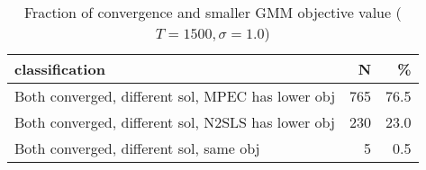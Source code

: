 \begin{table}

\caption{\label{tab:unnamed-chunk-23}Fraction of convergence and smaller GMM objective value ($T=1500,\sigma=1.0$)}
\centering
\begin{tabular}[t]{lrr}
\toprule
classification & N & \%\\
\midrule
Both converged, different sol, MPEC has lower obj & 765 & 76.5\\
Both converged, different sol, N2SLS has lower obj & 230 & 23.0\\
Both converged, different sol, same obj & 5 & 0.5\\
\bottomrule
\end{tabular}
\end{table}
